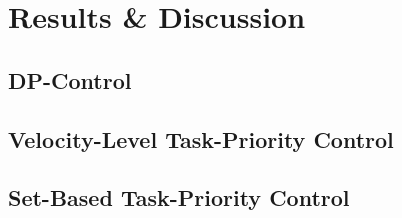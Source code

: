 \chapter{Results \& Discussion}

\section{DP-Control}

\section{Velocity-Level Task-Priority Control}

\section{Set-Based Task-Priority Control}

